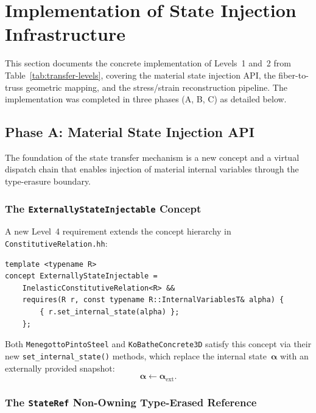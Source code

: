 \section{Implementation of State Injection Infrastructure}
\label{sec:state-injection-impl}

This section documents the concrete implementation of Levels~1 and~2
from Table~\ref{tab:transfer-levels}, covering the material state
injection API, the fiber-to-truss geometric mapping, and the
stress/strain reconstruction pipeline.  The implementation was
completed in three phases (A, B, C) as detailed below.


\subsection{Phase A: Material State Injection API}
\label{ssec:phase-a-injection-api}

The foundation of the state transfer mechanism is a new concept and
a virtual dispatch chain that enables injection of material internal
variables through the type-erasure boundary.

\subsubsection{The \texttt{ExternallyStateInjectable} Concept}

A new Level~4 requirement extends the concept hierarchy in
\texttt{ConstitutiveRelation.hh}:

\begin{lstlisting}
template <typename R>
concept ExternallyStateInjectable =
    InelasticConstitutiveRelation<R> &&
    requires(R r, const typename R::InternalVariablesT& alpha) {
        { r.set_internal_state(alpha) };
    };
\end{lstlisting}

Both \texttt{MenegottoPintoSteel} and \texttt{KoBatheConcrete3D}
satisfy this concept via their new \texttt{set\_internal\_state()}
methods, which replace the internal state~$\boldsymbol{\alpha}$
with an externally provided snapshot:
\[
  \boldsymbol{\alpha} \leftarrow \boldsymbol{\alpha}_{\text{ext}}.
\]

\subsubsection{The \texttt{StateRef} Non-Owning Type-Erased Reference}

